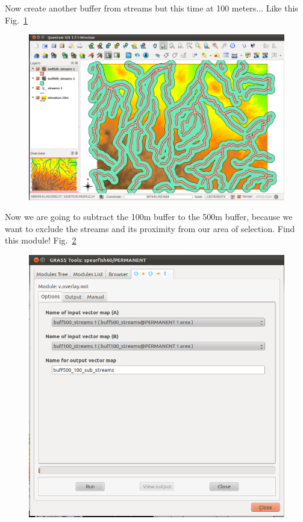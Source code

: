 Now create another buffer from streams but this time at 100 meters...
Like this Fig.~\ref{fig:qgis038}

\begin{figure}[htbp]
   \centering
   \includegraphics[scale=0.2]{qgis038.png}
   \caption{}
   \label{fig:qgis038}
\end{figure}

Now we are going to subtract the 100m buffer to the 500m buffer, because
we want to exclude the streams and its proximity from our area of
selection. Find this module! Fig.~\ref{fig:qgis039}

\begin{figure}[htbp]
   \centering
   \includegraphics[scale=0.3]{qgis039.png}
   \caption{}
   \label{fig:qgis039}
\end{figure}

